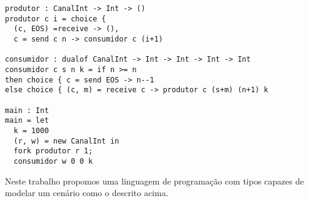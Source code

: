 \begin{lstlisting}
produtor : CanalInt -> Int -> ()
produtor c i = choice {
  (c, EOS) =receive -> (),
  c = send c n -> consumidor c (i+1)

consumidor : dualof CanalInt -> Int -> Int -> Int -> Int
consumidor c s n k = if n >= n
then choice { c = send EOS -> n--1
else choice { (c, m) = receive c -> produtor c (s+m) (n+1) k

main : Int
main = let
  k = 1000
  (r, w) = new CanalInt in
  fork produtor r 1;
  consumidor w 0 0 k

\end{lstlisting}


Neste trabalho propomos uma linguagem de programação
com tipos capazes de modelar um cenário como o descrito acima.



